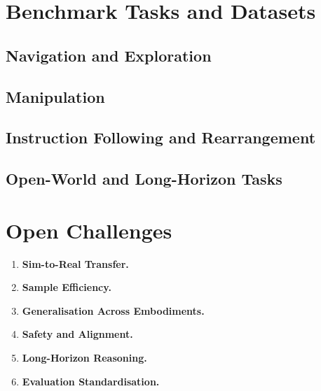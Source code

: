 \documentclass[12pt, a4paper]{article}
\begin{document}
\section{Benchmark Tasks and Datasets}
\label{sec:tasks}

\subsection{Navigation and Exploration}

\subsection{Manipulation}

\subsection{Instruction Following and Rearrangement}

\subsection{Open-World and Long-Horizon Tasks}

\section{Open Challenges}
\label{sec:challenges}

\begin{enumerate}[leftmargin=*, label=\textbf{C\arabic*.}]

  \item \textbf{Sim-to-Real Transfer.}

  \item \textbf{Sample Efficiency.}

  \item \textbf{Generalisation Across Embodiments.}

  \item \textbf{Safety and Alignment.}

  \item \textbf{Long-Horizon Reasoning.}

  \item \textbf{Evaluation Standardisation.}

\end{enumerate}
\end{document}
